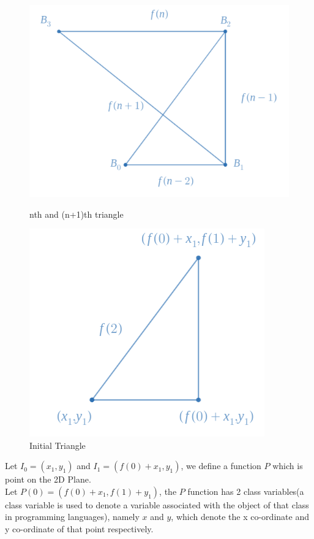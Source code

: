 \documentclass[preprint,12pt]{elsarticle}
\begin{document}
	\begin{figure}
		\centering
		\begin{minipage}{0.45\textwidth}
			\label{fig1}
			\centering
			\includegraphics[scale=0.4]{images/GFKT1.png}
			\caption{nth and (n+1)th triangle}
		\end{minipage}\hfill
		\begin{minipage}{0.45\textwidth}
			\centering
			\includegraphics[scale=0.46]{images/GFKT2.png}
			\caption{Initial Triangle}
		\end{minipage}
	\end{figure}
	Let $I_0 = (x_1, y_1)$ and $I_1 = (f(0) + x_1, y_1)$, we define a function $P$ which is point on the 2D Plane.\\
	Let $P(0) = (f(0) + x_1, f(1) + y_1)$, the $P$ function has 2 class variables(a class variable is used to denote a variable associated with the object of that class in programming languages), namely $x$ and $y$, which denote the x co-ordinate and y co-ordinate of that point respectively.\\
\end{document}
